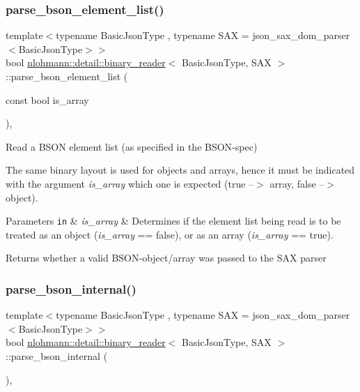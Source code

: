\subsubsection{\texorpdfstring{parse\+\_\+bson\+\_\+element\+\_\+list()}{parse\_bson\_element\_list()}}
{\footnotesize\ttfamily template$<$typename Basic\+Json\+Type , typename S\+AX  = json\+\_\+sax\+\_\+dom\+\_\+parser$<$\+Basic\+Json\+Type$>$$>$ \\
bool \mbox{\hyperlink{classnlohmann_1_1detail_1_1binary__reader}{nlohmann\+::detail\+::binary\+\_\+reader}}$<$ Basic\+Json\+Type, S\+AX $>$\+::parse\+\_\+bson\+\_\+element\+\_\+list (\begin{DoxyParamCaption}\item[{const bool}]{is\+\_\+array }\end{DoxyParamCaption})\hspace{0.3cm}{\ttfamily [inline]}, {\ttfamily [private]}}



Read a B\+S\+ON element list (as specified in the B\+S\+O\+N-\/spec) 

The same binary layout is used for objects and arrays, hence it must be indicated with the argument {\itshape is\+\_\+array} which one is expected (true --$>$ array, false --$>$ object).


\begin{DoxyParams}[1]{Parameters}
\mbox{\tt in}  & {\em is\+\_\+array} & Determines if the element list being read is to be treated as an object ({\itshape is\+\_\+array} == false), or as an array ({\itshape is\+\_\+array} == true). \\
\hline
\end{DoxyParams}
\begin{DoxyReturn}{Returns}
whether a valid B\+S\+O\+N-\/object/array was passed to the S\+AX parser 
\end{DoxyReturn}
\mbox{\label{classnlohmann_1_1detail_1_1binary__reader_a950f6ef800421fef9499af1c4c8918f5}} 
\subsubsection{\texorpdfstring{parse\+\_\+bson\+\_\+internal()}{parse\_bson\_internal()}}
{\footnotesize\ttfamily template$<$typename Basic\+Json\+Type , typename S\+AX  = json\+\_\+sax\+\_\+dom\+\_\+parser$<$\+Basic\+Json\+Type$>$$>$ \\
bool \mbox{\hyperlink{classnlohmann_1_1detail_1_1binary__reader}{nlohmann\+::detail\+::binary\+\_\+reader}}$<$ Basic\+Json\+Type, S\+AX $>$\+::parse\+\_\+bson\+\_\+internal (\begin{DoxyParamCaption}{ }\end{DoxyParamCaption})\hspace{0.3cm}{\ttfamily [inline]}, {\ttfamily [private]}}



